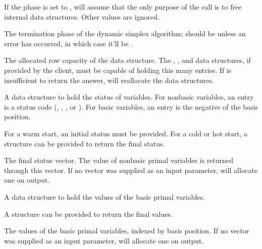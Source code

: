\begin{codedoc}
  \item{}
  \begin{description}[\textbf{(o)}]
    \item[\textbf{(i)}]
    If the phase is set to , \dylp will assume that the only
    purpose of the call is to free internal data structures.
    Other values are ignored.
  
    \item[\textbf{(o)}]
    The termination phase of the dynamic simplex algorithm; should be
     unless an error has occurred, in which case it'll be
    .
  \end{description}

\item{}
  The allocated row capacity of the data structure.
  The , , and  data structures, if provided by
  the client, must be capable of holding this many entries.
  If  is insufficient to return the answer, \dylp will
  reallocate the data structures.

\item{}
  A data structure to hold the status of variables.
  For nonbasic variables, an entry is a \dylp status code
  (, , , or
   ).
  For basic variables, an entry is the negative of the basis position.
  \begin{description}[\textbf{(o)}]
    \item[\textbf{(i)}]
    For a warm start, an initial status must be provided.
    For a cold or hot start, a structure can be provided to return the
    final status.

    \item[\textbf{(o)}]
    The final status vector.
    The value of nonbasic primal variables is returned through this
    vector.
    If no vector was supplied as an input parameter, \dylp will allocate
    one on output.
  \end{description}

  \item{} A data structure to hold the values of the basic primal
  variables.
  \begin{description}[\textbf{(o)}]
    \item[\textbf{(i)}]
    A structure can be provided to return the final values.

    \item[\textbf{(o)}]
    The values of the basic primal variables, indexed by basis position.
    If no vector was supplied as an input parameter, \dylp will allocate
    one on output.
  \end{description}


\end{codedoc}
